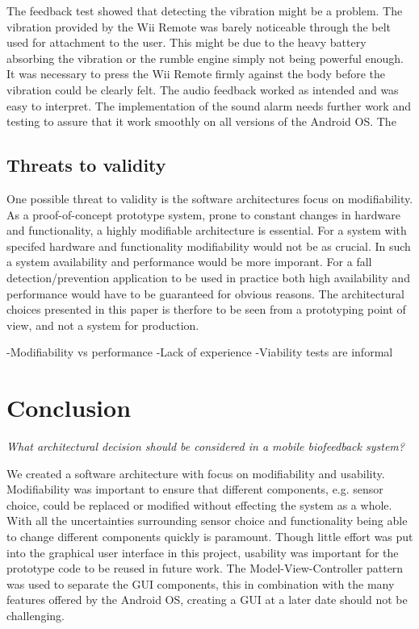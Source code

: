 The feedback test showed that detecting the vibration might be a problem. The vibration provided by the Wii Remote was barely noticeable through the belt used for attachment to the user. This might be due to the heavy battery absorbing the vibration or the rumble engine simply not being powerful enough. It was necessary to press the Wii Remote firmly against the body before the vibration could be clearly felt. The audio feedback worked as intended and was easy to interpret. The implementation of the sound alarm needs further work and testing to assure that it work smoothly on all versions of the Android OS.
The

\subsection{Threats to validity}
One possible threat to validity is the software architectures focus on modifiability. As a proof-of-concept prototype system, prone to constant changes in hardware and functionality, a highly modifiable architecture is essential. For a system with specifed hardware and functionality modifiability would not be as crucial. In such a system availability and performance would be more imporant. For a fall detection/prevention application to be used in practice both high availability and performance would have to be guaranteed for obvious reasons. The architectural choices presented in this paper is therfore to be seen from a prototyping point of view, and not a system for production.

-Modifiability vs performance
-Lack of experience
-Viability tests are informal


\section{Conclusion}

\textit{What architectural decision should be considered in a mobile biofeedback system?}


We created a software architecture with focus on modifiability and usability. Modifiability was important to ensure that different components, e.g. sensor choice, could be replaced or modified without effecting the system as a whole. With all the uncertainties surrounding sensor choice and functionality being able to change different components quickly is paramount. Though little effort was put into the graphical user interface in this project, usability was important for the prototype code to be reused in future work. The Model-View-Controller pattern was used to separate the GUI components, this in combination with the many features offered by the Android OS, creating a GUI at a later date should not be challenging.


